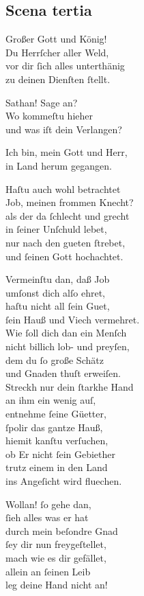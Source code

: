 \documentclass{ees}
\newenvironment{lyrics}[1]{%
  \subsection{#1}\nopagebreak%
  \begin{lyricslist}%
  \let\voice\item%
}{%
  \end{lyricslist}%
}
\begin{document}
\begin{lyrics}{Scena tertia}
  \voice[Die Kinder Gottes]
  Großer Gott und König!\\
  Du Herrſcher aller Weld,\\
  vor dir ſich alles unterthänig\\
  zu deinen Dienſten ſtellt.

  \voice[Schöpffer]
  Sathan! Sage an?\\
  Wo kommeſtu hieher\\
  und was iſt dein Verlangen?

  \voice[Leviathan]
  Ich bin, mein Gott und Herr,\\
  in Land herum gegangen.

  \voice[Schöpffer]
  Haſtu auch wohl betrachtet\\
  Job, meinen frommen Knecht?\\
  als der da ſchlecht und grecht\\
  in ſeiner Unſchuld lebet,\\
  nur nach den gueten ſtrebet,\\
  und ſeinen Gott hochachtet.

  \voice[Leviathan]
  Vermeinſtu dan, daß Job\\
  umſonst dich alſo ehret,\\
  haſtu nicht all ſein Guet,\\
  ſein Hauß und Viech vermehret.\\
  Wie ſoll dich dan ein Menſch\\
  nicht billich lob- und preyſen,\\
  dem du ſo große Schätz\\
  und Gnaden thuſt erweiſen.\\
  Streckh nur dein ſtarkhe Hand\\
  an ihm ein wenig auſ,\\
  entnehme ſeine Güetter,\\
  ſpolir das gantze Hauß,\\
  hiemit kanſtu verſuchen,\\
  ob Er nicht ſein Gebiether\\
  trutz einem in den Land\\
  ins Angeſicht wird fluechen.

  \voice[Schöpffer]
  Wollan! ſo gehe dan,\\
  ſieh alles was er hat\\
  durch mein beſondre Gnad\\
  ſey dir nun freygeſtellet,\\
  mach wie es dir gefället,\\
  allein an ſeinen Leib\\
  leg deine Hand nicht an!
\end{lyrics}
\end{document}
